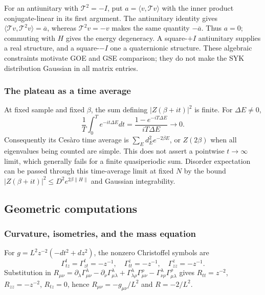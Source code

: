 \documentclass[11pt]{article}
\numberwithin{equation}{section}
\theoremstyle{exposition}
\theoremstyle{result}
\begin{document}
For an antiunitary with $\mathcal T^2=-I$, put $a=\langle v,\mathcal Tv\rangle$ with the inner product conjugate-linear in its first argument. The antiunitary identity gives $\langle\mathcal Tv,\mathcal T^2v\rangle=\overline a$, whereas $\mathcal T^2v=-v$ makes the same quantity $-\overline a$. Thus $a=0$; commuting with $H$ gives the energy degeneracy. A square-$+I$ antiunitary supplies a real structure, and a square-$-I$ one a quaternionic structure. These algebraic constraints motivate GOE and GSE comparison; they do not make the SYK distribution Gaussian in all matrix entries.

\subsubsection{The plateau as a time average}
At fixed sample and fixed $\beta$, the sum defining $|Z(\beta+it)|^2$ is finite. For $\Delta E\ne0$,
\begin{equation*}
\frac1T\int_0^T e^{-it\Delta E}dt
=\frac{1-e^{-iT\Delta E}}{iT\Delta E}\longrightarrow0.
\end{equation*}
Consequently its Ces\`aro time average is $\sum_E d_E^2e^{-2\beta E}$, or $Z(2\beta)$ when all eigenvalues being counted are simple. This does not assert a pointwise $t\to\infty$ limit, which generally fails for a finite quasiperiodic sum. Disorder expectation can be passed through this time-average limit at fixed $N$ by the bound $|Z(\beta+it)|^2\leq D^2e^{2\beta\|H\|}$ and Gaussian integrability.

\subsection{Geometric computations}\label{app:gravityDetails}

\subsubsection{Curvature, isometries, and the mass equation}
For $g=L^2z^{-2}(-dt^2+dz^2)$, the nonzero Christoffel symbols are
\begin{equation*}
\Gamma^t_{tz}=\Gamma^t_{zt}=-z^{-1},\quad
\Gamma^z_{tt}=-z^{-1},\quad \Gamma^z_{zz}=-z^{-1}.
\end{equation*}
Substitution in $R_{\mu\nu}=\partial_\lambda\Gamma^\lambda_{\mu\nu}-\partial_\nu\Gamma^\lambda_{\mu\lambda}+\Gamma^\lambda_{\lambda\rho}\Gamma^\rho_{\mu\nu}-\Gamma^\lambda_{\nu\rho}\Gamma^\rho_{\mu\lambda}$ gives $R_{tt}=z^{-2}$, $R_{zz}=-z^{-2}$, $R_{tz}=0$, hence $R_{\mu\nu}=-g_{\mu\nu}/L^2$ and $R=-2/L^2$.
\end{document}
